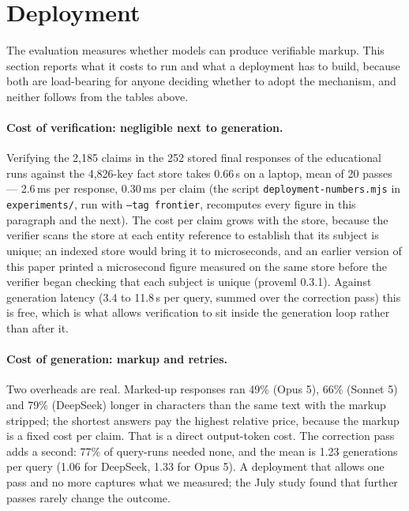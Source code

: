 \documentclass[11pt,a4paper]{article}
\begin{document}
\section{Deployment}
\label{sec:deployment}

The evaluation measures whether models can produce verifiable markup. This section reports what it costs to run and what a deployment has to build, because both are load-bearing for anyone deciding whether to adopt the mechanism, and neither follows from the tables above.

\paragraph{Cost of verification: negligible next to generation.} Verifying the 2{,}185 claims in the 252 stored final responses of the educational runs against the 4{,}826-key fact store takes 0.66\,s on a laptop, mean of 20 passes --- 2.6\,ms per response, 0.30\,ms per claim (the script \texttt{deployment-numbers.mjs} in \texttt{experiments/}, run with \texttt{--tag frontier}, recomputes every figure in this paragraph and the next). The cost per claim grows with the store, because the verifier scans the store at each entity reference to establish that its subject is unique; an indexed store would bring it to microseconds, and an earlier version of this paper printed a microsecond figure measured on the same store before the verifier began checking that each subject is unique (proveml 0.3.1). Against generation latency (3.4 to 11.8\,s per query, summed over the correction pass) this is free, which is what allows verification to sit inside the generation loop rather than after it.

\paragraph{Cost of generation: markup and retries.} Two overheads are real. Marked-up responses ran 49\% (Opus 5), 66\% (Sonnet 5) and 79\% (DeepSeek) longer in characters than the same text with the markup stripped; the shortest answers pay the highest relative price, because the markup is a fixed cost per claim. That is a direct output-token cost. The correction pass adds a second: 77\% of query-runs needed none, and the mean is 1.23 generations per query (1.06 for DeepSeek, 1.33 for Opus 5). A deployment that allows one pass and no more captures what we measured; the July study found that further passes rarely change the outcome.
\end{document}
